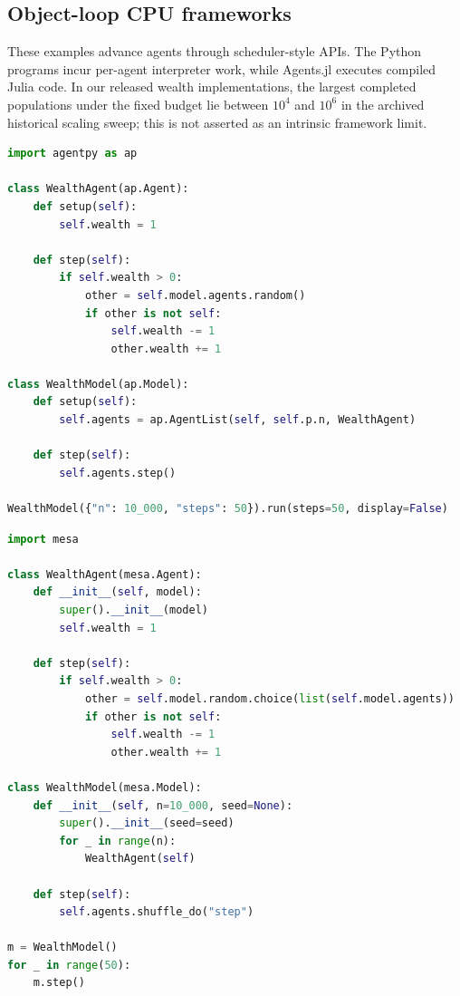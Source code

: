 \documentclass[sigconf,nonacm,review,natbib=true]{acmart}
\newcommand{\appendixbreak}{%
  \FloatBarrier
}
\theoremstyle{definition}
\theoremstyle{plain}
\theoremstyle{remark}
\begin{document}
\appendixbreak
\subsection{Object-loop CPU frameworks}
\label{app:usage:loops}

These examples advance agents through scheduler-style APIs. The Python programs
incur per-agent interpreter work, while Agents.jl executes compiled Julia code.
In our released wealth implementations, the largest completed populations under
the fixed budget lie between $10^4$ and $10^6$ in the archived historical
scaling sweep; this is not asserted as an intrinsic framework limit.

\begin{lstlisting}[style=applisting,language=Python,caption={AgentPy wealth transfer.},label={lst:agentpy}]
import agentpy as ap

class WealthAgent(ap.Agent):
    def setup(self):
        self.wealth = 1

    def step(self):
        if self.wealth > 0:
            other = self.model.agents.random()
            if other is not self:
                self.wealth -= 1
                other.wealth += 1

class WealthModel(ap.Model):
    def setup(self):
        self.agents = ap.AgentList(self, self.p.n, WealthAgent)

    def step(self):
        self.agents.step()

WealthModel({"n": 10_000, "steps": 50}).run(steps=50, display=False)
\end{lstlisting}

\noindent\begin{minipage}{\textwidth}
\begin{lstlisting}[style=applisting,language=Python,caption={Mesa 3.x wealth transfer.},label={lst:mesa}]
import mesa

class WealthAgent(mesa.Agent):
    def __init__(self, model):
        super().__init__(model)
        self.wealth = 1

    def step(self):
        if self.wealth > 0:
            other = self.model.random.choice(list(self.model.agents))
            if other is not self:
                self.wealth -= 1
                other.wealth += 1

class WealthModel(mesa.Model):
    def __init__(self, n=10_000, seed=None):
        super().__init__(seed=seed)
        for _ in range(n):
            WealthAgent(self)

    def step(self):
        self.agents.shuffle_do("step")

m = WealthModel()
for _ in range(50):
    m.step()
\end{lstlisting}
\end{minipage}
\end{document}
